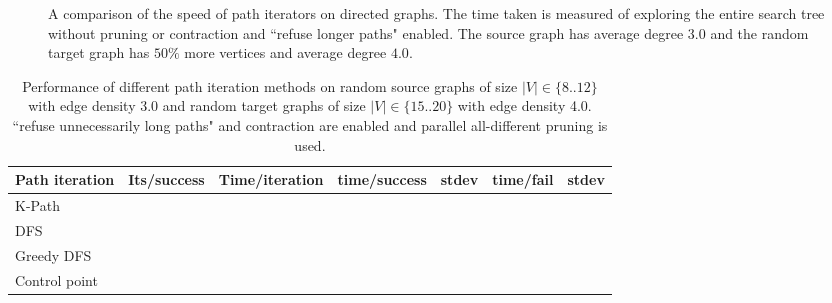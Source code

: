 \begin{figure}
    \caption{A comparison of the speed of path iterators on directed graphs. The time taken is measured of exploring the entire search tree without pruning or contraction and ``refuse longer paths" enabled. The source graph has average degree $3.0$ and the random target graph has $50\%$ more vertices and average degree $4.0$.}
\end{figure}

\begin{table}[ht]
\centering
\begin{tabular}{|l|l|l|l|l|l|l|}
\hline
\textbf{Path iteration} &
  \textbf{Its/success} &
  \textbf{Time/iteration} &
  \textbf{time/success} &
  \textbf{stdev} &
  \textbf{time/fail} &
  \textbf{stdev} \\ \hline
K-Path        &  &  &  &  &  &  \\ \hline
DFS           &  &  &  &  &  &  \\ \hline
Greedy DFS    &  &  &  &  &  &  \\ \hline
Control point &  &  &  &  &  &  \\ \hline
\end{tabular}
\caption{Performance of different path iteration methods on random source graphs of size $|V|\in \{8..12\}$ with edge density 3.0 and random target graphs of size $|V|\in \{15..20\}$ with edge density 4.0. ``refuse unnecessarily long paths" and contraction are enabled and parallel all-different pruning is used.}
\label{tab:iterator-performance}
\end{table}




